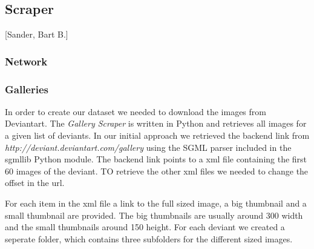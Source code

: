 \subsection{Scraper}
[Sander, Bart B.]

\subsubsection{Network}

\subsubsection{Galleries}
In order to create our dataset we needed to download the images from Deviantart. 
The \textit{Gallery Scraper} is written in Python and retrieves all images for a given 
list of deviants. In our initial approach we retrieved 
the backend link from \textit{http://deviant.deviantart.com/gallery} using the 
SGML parser included in the sgmllib Python module. The backend link points 
to a xml file containing the first 60 images of the deviant. TO retrieve the other 
xml files we needed to change the offset in the url. 

For each item in the xml file a link to the full sized image, a big thumbnail and 
a small thumbnail are provided. The big thumbnails are usually around 300 width and 
the small thumbnails around 150 height. For each deviant we created a seperate folder, which
contains three subfolders for the different sized images. 

